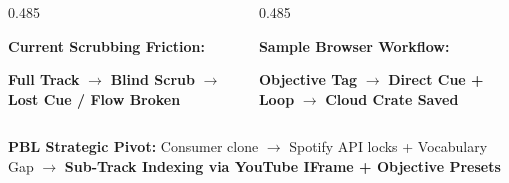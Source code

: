 \begin{frame}[t]
  \vspace{1mm}

  \begin{columns}[onlytextwidth, T]
    \begin{column}{0.485\textwidth}
      \begin{tcolorbox}[standardcard, top=2.5pt, bottom=2.5pt]
        {\scriptsize\bfseries\textcolor{textdim}{Current Scrubbing Friction:}}\par\vspace{0.6mm}
        \centering
        {\tiny\textbf{\textcolor{textmuted}{Full Track}} \textcolor{textdim}{$\longrightarrow$} \textbf{\textcolor{textmuted}{Blind Scrub}} \textcolor{textdim}{$\longrightarrow$} \textbf{\textcolor{cardborder!40!textwhite}{Lost Cue / Flow Broken}}}
      \end{tcolorbox}
    \end{column}

    \begin{column}{0.485\textwidth}
      \begin{tcolorbox}[standardcard, top=2.5pt, bottom=2.5pt]
        {\scriptsize\bfseries\textcolor{accentemerald}{Sample Browser Workflow:}}\par\vspace{0.6mm}
        \centering
        {\tiny\textbf{\textcolor{textwhite}{Objective Tag}} \textcolor{textdim}{$\longrightarrow$} \textbf{\textcolor{accentemerald}{Direct Cue + Loop}} \textcolor{textdim}{$\longrightarrow$} \textbf{\textcolor{accentemerald}{Cloud Crate Saved}}}
      \end{tcolorbox}
    \end{column}
  \end{columns}

  \vspace{1mm}

  \begin{tcolorbox}[innercard, left=6pt, right=6pt, top=2pt, bottom=2pt]
    \centering
    {\tiny\bfseries\textcolor{textdim}{PBL Strategic Pivot:}} \quad
    {\tiny\textcolor{textmuted}{Consumer clone} \textcolor{textdim}{$\longrightarrow$} \textcolor{textmuted}{Spotify API locks + Vocabulary Gap} \textcolor{textdim}{$\longrightarrow$} \textbf{\textcolor{accentemerald}{Sub-Track Indexing via YouTube IFrame + Objective Presets}}}
  \end{tcolorbox}
\end{frame}
